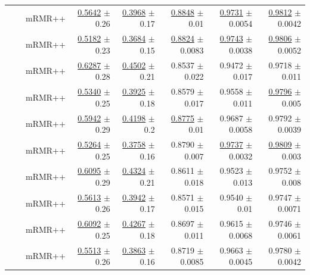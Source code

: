 \begin{longtable}{llp{}rrrrr}
 &  & mRMR++ & \underline{0.5642} {\scriptsize $\pm$ 0.26} & \underline{0.3968} {\scriptsize $\pm$ 0.17} & \underline{0.8848} {\scriptsize $\pm$ 0.01} & \underline{0.9731} {\scriptsize $\pm$ 0.0054} & \underline{0.9812} {\scriptsize $\pm$ 0.0042} \\
 &  & mRMR++ & \underline{0.5182} {\scriptsize $\pm$ 0.23} & \underline{0.3684} {\scriptsize $\pm$ 0.15} & \underline{0.8824} {\scriptsize $\pm$ 0.0083} & \underline{0.9743} {\scriptsize $\pm$ 0.0038} & \underline{0.9806} {\scriptsize $\pm$ 0.0052} \\
 &  & mRMR++ & \underline{0.6287} {\scriptsize $\pm$ 0.28} & \underline{0.4502} {\scriptsize $\pm$ 0.21} & 0.8537 {\scriptsize $\pm$ 0.022} & 0.9472 {\scriptsize $\pm$ 0.017} & 0.9718 {\scriptsize $\pm$ 0.011} \\
 &  & mRMR++ & \underline{0.5340} {\scriptsize $\pm$ 0.25} & \underline{0.3925} {\scriptsize $\pm$ 0.18} & 0.8579 {\scriptsize $\pm$ 0.017} & 0.9558 {\scriptsize $\pm$ 0.011} & \underline{0.9796} {\scriptsize $\pm$ 0.005} \\
 &  & mRMR++ & \underline{0.5942} {\scriptsize $\pm$ 0.29} & \underline{0.4198} {\scriptsize $\pm$ 0.2} & \underline{0.8775} {\scriptsize $\pm$ 0.01} & 0.9687 {\scriptsize $\pm$ 0.0058} & 0.9792 {\scriptsize $\pm$ 0.0039} \\
 &  & mRMR++ & \underline{0.5264} {\scriptsize $\pm$ 0.25} & \underline{0.3758} {\scriptsize $\pm$ 0.16} & 0.8790 {\scriptsize $\pm$ 0.007} & \underline{0.9737} {\scriptsize $\pm$ 0.0032} & \underline{0.9809} {\scriptsize $\pm$ 0.003} \\
 &  & mRMR++ & \underline{0.6095} {\scriptsize $\pm$ 0.29} & \underline{0.4324} {\scriptsize $\pm$ 0.21} & 0.8611 {\scriptsize $\pm$ 0.018} & 0.9523 {\scriptsize $\pm$ 0.013} & 0.9752 {\scriptsize $\pm$ 0.008} \\
 &  & mRMR++ & \underline{0.5613} {\scriptsize $\pm$ 0.26} & \underline{0.3942} {\scriptsize $\pm$ 0.17} & 0.8571 {\scriptsize $\pm$ 0.015} & 0.9540 {\scriptsize $\pm$ 0.01} & 0.9747 {\scriptsize $\pm$ 0.0071} \\
 &  & mRMR++ & \underline{0.6092} {\scriptsize $\pm$ 0.25} & \underline{0.4267} {\scriptsize $\pm$ 0.18} & 0.8697 {\scriptsize $\pm$ 0.011} & 0.9615 {\scriptsize $\pm$ 0.0068} & 0.9746 {\scriptsize $\pm$ 0.0061} \\
 &  & mRMR++ & \underline{0.5513} {\scriptsize $\pm$ 0.26} & \underline{0.3863} {\scriptsize $\pm$ 0.16} & 0.8719 {\scriptsize $\pm$ 0.0085} & 0.9663 {\scriptsize $\pm$ 0.0045} & 0.9780 {\scriptsize $\pm$ 0.0042} \\

\end{longtable}
